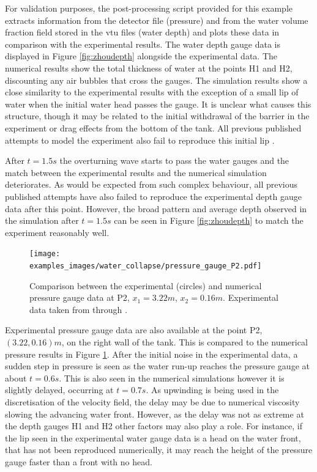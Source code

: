 For validation purposes, the post-processing script provided for this example extracts information from the detector file (pressure) and from the water volume fraction field stored in the vtu files (water depth) and plots these data in comparison with the experimental results. The water depth gauge data is displayed in Figure \ref{fig:zhoudepth} alongside the experimental data.  The numerical results show the total thickness of water at the points H1 and H2, discounting any air bubbles that cross the gauges.  The simulation results show a close similarity to the experimental results with the exception of a small lip of water when the initial water head passes the gauge.  It is unclear what causes this structure, though it may be related to the initial withdrawal of the barrier in the experiment or drag effects from the bottom of the tank.  All previous published attempts to model the experiment also fail to reproduce this initial lip \citep{zhou_nonlinear_1999, lee_numerical_2002, colagrossi_numerical_2003, 
park_volume-of-fluid_2009}.

After $t=1.5s$ the overturning wave starts to pass the water gauges and the match between the experimental results and the numerical simulation deteriorates. As would be expected from such complex behaviour, all previous published attempts have also failed to reproduce the experimental depth gauge data after this point.  However, the broad pattern and average depth observed in the simulation after $t=1.5s$ can be seen in Figure \ref{fig:zhoudepth} to match the experiment reasonably well.

\begin{figure}[tb]
\begin{center}
\texttt{[image: examples\_images/water\_collapse/pressure\_gauge\_P2.pdf]}
\caption{Comparison between the experimental (circles) and numerical pressure gauge data at P2, $x_1 = 3.22m$, $x_2 = 0.16m$. Experimental data taken from \citet{zhou_nonlinear_1999} through \citet{park_volume-of-fluid_2009}.}
\label{fig:zhoupressure}
\end{center}
\end{figure}

Experimental pressure gauge data are also available at the point P2, $(3.22,0.16)m$, on the right wall of the tank.  This is compared to the numerical pressure results in Figure \ref{fig:zhoupressure}.  After the initial noise in the experimental data, a sudden step in pressure is seen as the water run-up reaches the pressure gauge at about $t=0.6s$.  This is also seen in the numerical simulations however it is slightly delayed, occurring at $t=0.7s$.  As upwinding is being used in the discretisation of the velocity field, the delay may be due to numerical viscosity slowing the advancing water front.  However, as the delay was not as extreme at the depth gauges H1 and H2 other factors may also play a role.  For instance, if the lip seen in the experimental water gauge data is a head on the water front, that has not been reproduced numerically, it may reach the height of the pressure gauge faster than a front with no head.

